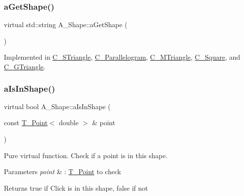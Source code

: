 \mbox{\label{classA__Shape_a1b202256a4e5dcb0edab4ab93a37122c}} 
\subsubsection{\texorpdfstring{a\+Get\+Shape()}{aGetShape()}}
{\footnotesize\ttfamily virtual std\+::string A\+\_\+\+Shape\+::a\+Get\+Shape (\begin{DoxyParamCaption}{ }\end{DoxyParamCaption})\hspace{0.3cm}{\ttfamily [pure virtual]}}



Implemented in \hyperlink{classC__STriangle_a40c1434870b99112c4457819c9295483}{C\+\_\+\+S\+Triangle}, \hyperlink{classC__Parallelogram_a373fdd3ebdfeffcaa0a72ff7001af8ec}{C\+\_\+\+Parallelogram}, \hyperlink{classC__MTriangle_aca7e38c6bf9695aacf54aa03ecfba978}{C\+\_\+\+M\+Triangle}, \hyperlink{classC__Square_a4919017d3750c1b8deb5f07d22069636}{C\+\_\+\+Square}, and \hyperlink{classC__GTriangle_a039e79bb17dae01997b11243de457d98}{C\+\_\+\+G\+Triangle}.

\mbox{\label{classA__Shape_a63f825cbc9780208d9a137f5c14917d0}} 
\subsubsection{\texorpdfstring{a\+Is\+In\+Shape()}{aIsInShape()}}
{\footnotesize\ttfamily virtual bool A\+\_\+\+Shape\+::a\+Is\+In\+Shape (\begin{DoxyParamCaption}\item[{const \hyperlink{classT__Point}{T\+\_\+\+Point}$<$ double $>$ \&}]{point }\end{DoxyParamCaption})\hspace{0.3cm}{\ttfamily [pure virtual]}}



Pure virtual function. Check if a point is in this shape. 


\begin{DoxyParams}{Parameters}
{\em point} & \+: \hyperlink{classT__Point}{T\+\_\+\+Point} to check \\
\hline
\end{DoxyParams}
\begin{DoxyReturn}{Returns}
true if Click is in this shape, false if not 
\end{DoxyReturn}


